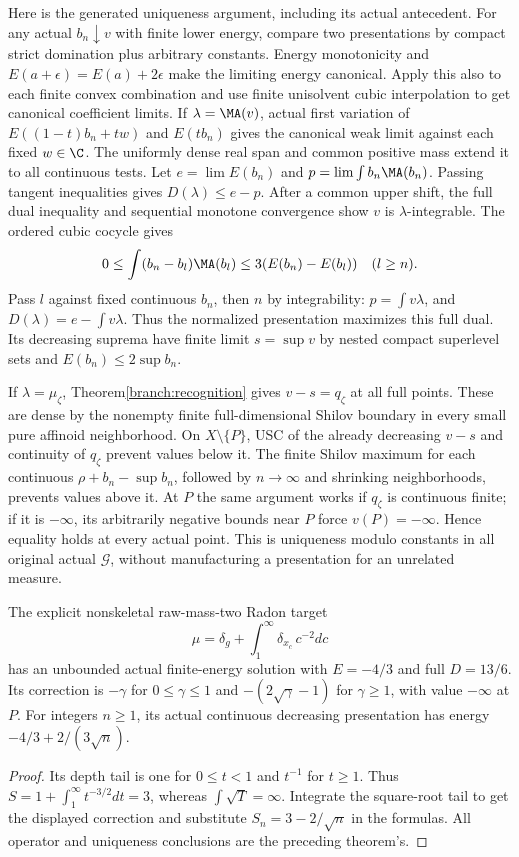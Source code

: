 Here is the generated uniqueness argument, including its actual antecedent.
For any actual $b_n\downarrow v$ with finite lower energy, compare two
presentations by compact strict domination plus arbitrary constants.
Energy monotonicity and $E(a+\epsilon)=E(a)+2\epsilon$ make the limiting
energy canonical. Apply this also to each finite convex combination and
use finite unisolvent cubic interpolation to get canonical coefficient
limits. If $\lambda=\MA(v)$, actual first variation of
$E((1-t)b_n+tw)$ and $E(tb_n)$ gives the canonical weak limit against each
fixed $w\in\C$. The uniformly dense real span and common positive mass
extend it to all continuous tests. Let $e=\lim E(b_n)$ and
$p=\lim\int b_n\MA(b_n)$. Passing tangent inequalities gives
$D(\lambda)\le e-p$. After a common upper shift, the full dual inequality
and sequential monotone convergence show $v$ is $\lambda$-integrable.
The ordered cubic cocycle gives
\[
 0\le\int(b_n-b_l)\MA(b_l)\le3(E(b_n)-E(b_l))\quad(l\ge n).
\]
Pass $l$ against fixed continuous $b_n$, then $n$ by integrability:
$p=\int v\lambda$, and $D(\lambda)=e-\int v\lambda$.
Thus the normalized presentation maximizes this full dual. Its decreasing
suprema have finite limit $s=\sup v$ by nested compact superlevel sets
and $E(b_n)\le2\sup b_n$.

If $\lambda=\mu_\zeta$, Theorem\ref{branch:recognition} gives
$v-s=q_\zeta$ at all full points. These are dense by the nonempty finite
full-dimensional Shilov boundary in every small pure affinoid neighborhood.
On $X\setminus\{P\}$, USC of the already decreasing $v-s$ and continuity
of $q_\zeta$ prevent values below it. The finite Shilov maximum for each
continuous $\rho+b_n-\sup b_n$, followed by $n\to\infty$ and shrinking
neighborhoods, prevents values above it. At $P$ the same argument works
if $q_\zeta$ is continuous finite; if it is $-\infty$, its arbitrarily
negative bounds near $P$ force $v(P)=-\infty$. Hence equality holds at
every actual point. This is uniqueness modulo constants in all original
actual $\mathcal G$, without manufacturing a presentation for an unrelated
measure.

\begin{corollary}\label{branch:unboundedexample}
The explicit nonskeletal raw-mass-two Radon target
\[
 \mu=\delta_g+\int_1^\infty\delta_{x_c}\,c^{-2}dc
\]
has an unbounded actual finite-energy solution with
$E=-4/3$ and full $D=13/6$. Its correction is $-\gamma$ for
$0\le\gamma\le1$ and $-(2\sqrt\gamma-1)$ for $\gamma\ge1$, with value
$-\infty$ at $P$. For integers $n\ge1$, its actual continuous decreasing
presentation has energy $-4/3+2/(3\sqrt n)$.
\end{corollary}
\begin{proof}
Its depth tail is one for $0\le t<1$ and $t^{-1}$ for $t\ge1$.
Thus $S=1+\int_1^\infty t^{-3/2}dt=3$, whereas
$\int\sqrt{T}=\infty$. Integrate the square-root tail to get the
displayed correction and substitute $S_n=3-2/\sqrt n$ in the formulas.
All operator and uniqueness conclusions are the preceding theorem's.
\end{proof}

